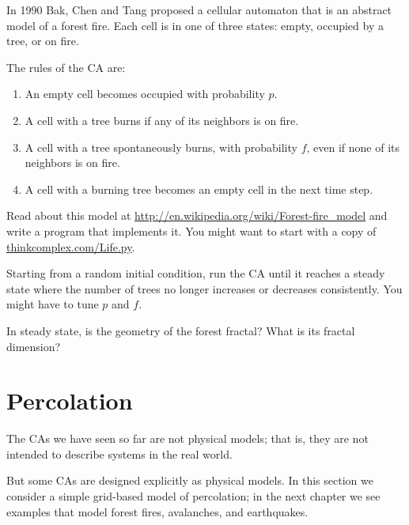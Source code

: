 \documentclass[10pt]{book}
\begin{document}
\begin{exercise}

In 1990 Bak, Chen and Tang proposed a cellular automaton that is
an abstract model of a forest fire.  Each cell is in one of three
states: empty, occupied by a tree, or on fire.

The rules of the CA are:

\begin{enumerate}

\item An empty cell becomes occupied with probability $p$.

\item A cell with a tree burns if any of its neighbors
  is on fire.

\item A cell with a tree spontaneously burns, with
  probability $f$, even if none of its neighbors is on fire.

\item A cell with a burning tree becomes an empty cell in the next
  time step.

\end{enumerate}

Read about this model at
\url{http://en.wikipedia.org/wiki/Forest-fire_model} and write a
program that implements it.  You might want to start with a copy of
\url{thinkcomplex.com/Life.py}.

Starting from a random initial condition, run the CA until it reaches
a steady state where the number of trees no longer increases or
decreases consistently.  You might have to tune $p$ and $f$.

In steady state, is the geometry of the forest fractal?
What is its fractal dimension?

\end{exercise}


\section{Percolation}

The CAs we have seen so far are not physical models; that is, they are
not intended to describe systems in the real world.

But some CAs are designed explicitly as physical models.  In this
section we consider a simple grid-based model of percolation;
in the next chapter we see examples that model forest fires,
avalanches, and earthquakes.
\end{document}
